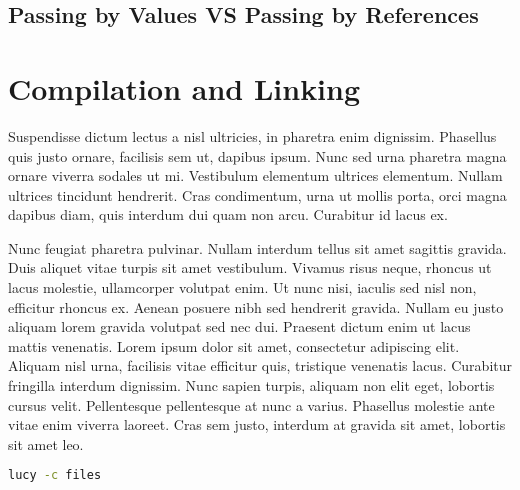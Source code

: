 \subsection{Passing by Values VS Passing by References}


\section{Compilation and Linking}
Suspendisse dictum lectus a nisl ultricies, in pharetra enim dignissim. Phasellus quis justo ornare, facilisis sem ut, dapibus ipsum. Nunc sed urna pharetra magna ornare viverra sodales ut mi. Vestibulum elementum ultrices elementum. Nullam ultrices tincidunt hendrerit. Cras condimentum, urna ut mollis porta, orci magna dapibus diam, quis interdum dui quam non arcu. Curabitur id lacus ex.

Nunc feugiat pharetra pulvinar. Nullam interdum tellus sit amet sagittis gravida. Duis aliquet vitae turpis sit amet vestibulum. Vivamus risus neque, rhoncus ut lacus molestie, ullamcorper volutpat enim. Ut nunc nisi, iaculis sed nisl non, efficitur rhoncus ex. Aenean posuere nibh sed hendrerit gravida. Nullam eu justo aliquam lorem gravida volutpat sed nec dui. Praesent dictum enim ut lacus mattis venenatis. Lorem ipsum dolor sit amet, consectetur adipiscing elit. Aliquam nisl urna, facilisis vitae efficitur quis, tristique venenatis lacus. Curabitur fringilla interdum dignissim. Nunc sapien turpis, aliquam non elit eget, lobortis cursus velit. Pellentesque pellentesque at nunc a varius. Phasellus molestie ante vitae enim viverra laoreet. Cras sem justo, interdum at gravida sit amet, lobortis sit amet leo.
\begin{lstlisting}[language=Bash]
  lucy -c files
\end{lstlisting}
